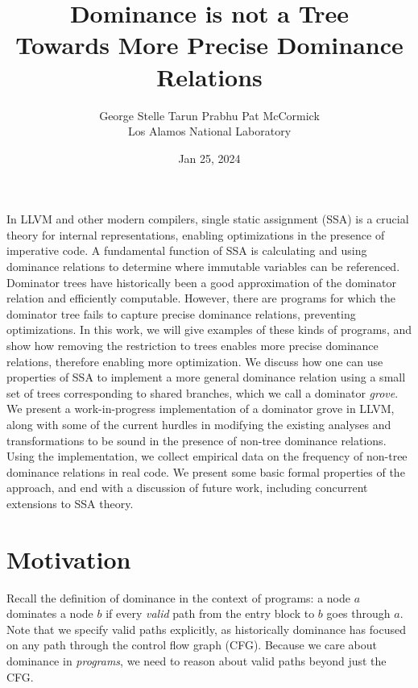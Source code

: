 \documentclass[a4paper,twocolumn]{article}
\title{Dominance is not a Tree \\
\Large{Towards More Precise Dominance Relations}}
\date{Jan 25, 2024}
\author{George Stelle \; Tarun Prabhu \; Pat McCormick \\ Los Alamos National Laboratory}
\begin{document}
\maketitle

In LLVM and other modern compilers, single static assignment (SSA) is a crucial
theory for internal representations, enabling optimizations in the presence of
imperative code. A fundamental function of SSA is calculating and using
dominance relations to determine where immutable variables can be referenced.
Dominator trees have historically been a good approximation of the dominator
relation and efficiently computable. However, there are programs for which the
dominator tree fails to capture precise dominance relations, preventing
optimizations. In this work, we will give examples of these kinds of programs,
and show how removing the restriction to trees enables more precise dominance
relations, therefore enabling more optimization. We discuss how one can use
properties of SSA to implement a more general dominance relation using a small
set of trees corresponding to shared branches, which we call a dominator
\emph{grove}. We present a work-in-progress implementation of a dominator grove
in LLVM, along with some of the current hurdles in modifying the existing
analyses and transformations to be sound in the presence of non-tree dominance
relations. Using the implementation, we collect empirical data on the frequency
of non-tree dominance relations in real code. We present some basic formal
properties of the approach, and end with a discussion of future work, including
concurrent extensions to SSA theory.  

\section*{Motivation}
Recall the definition of dominance in the context of programs: a node $a$
dominates a node $b$ if every \emph{valid} path from the entry block to $b$ goes
through $a$. Note that we specify valid paths explicitly, as historically
dominance has focused on any path through the control flow graph (CFG).
Because we care about dominance in \emph{programs}, we need to reason about
valid paths beyond just the CFG. 
\end{document}
